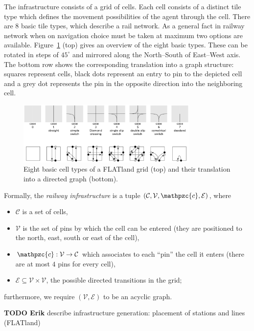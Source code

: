 \documentclass{article}
\begin{document}
The infrastructure consists of a grid of cells. Each cell consists of a distinct tile type which defines the movement possibilities of the agent through the cell. There are 8 basic tile types, which describe a rail network. As a general fact in railway network when on navigation choice must be taken at maximum two options are available. 
%
Figure~\ref{fig:H1_railway_elements} (top) gives an overview of the eight basic types. These can be rotated in steps of $45^\circ$ and mirrored along the North--South of East--West axis. The bottom row shows the corresponding translation into a graph structure: squares represent cells, black dots represent an entry to pin to the depicted cell and a grey dot represents the pin in the opposite direction into the neighboring cell.
%
\begin{figure}[hbtp]
	\centering
  \includegraphics[width=0.8\textwidth]{H1_railway_elements.png}
	\caption{Eight basic cell types of a FLATland grid (top) and their translation into a directed graph (bottom).}
	\label{fig:H1_railway_elements}
\end{figure}
%
Formally, the \emph{railway infrastructure} is a tuple  $(\mathcal{C}, \mathcal{V}, \mathpzc{c}, \mathcal{E})$, where
\begin{itemize}
    \item $\mathcal{C}$ is a set of cells,
    \item $\mathcal{V}$ is the set of pins by which the cell can be entered (they are positioned to the north, east, south or east of the cell),
    \item $\mathpzc{c}: \mathcal{V} \to \mathcal{C}$ which associates to each ``pin'' the cell it enters (there are at most $4$ pins for every cell),
    \item $\mathcal{E} \subseteq \mathcal{V} \times \mathcal{V}$, the possible directed transitions in the grid;
\end{itemize}
furthermore, we require $(\mathcal{V},\mathcal{E})$ to be an acyclic graph.



\begin{mdframed}
{\bf TODO Erik} describe infrastructure generation: placement of stations and lines (FLATland)
\end{mdframed}
\end{document}
